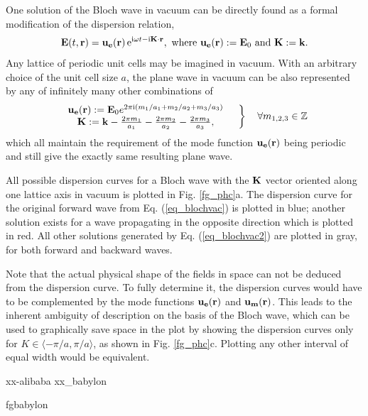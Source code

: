 One solution of the Bloch wave in vacuum can be directly found as a formal modification of the dispersion relation,
\begin{equation}  
\mathbf{E}(t, {\mathbf{r}}) = \mathbf{u_e}({\mathbf{r}})\,\mathrm{e}^{{\mathrm i}\omega t - {\mathrm i}{\mathbf{K}}\cdot{\mathbf{r}}}, \text{ where } \mathbf{u_e}({\mathbf{r}}) := \mathbf{E}_0  \text{ and } {\mathbf{K}} := {\mathbf{k}}.
\label{eq_blochvac}
\end{equation}
Any lattice of periodic unit cells may be imagined in vacuum. With an arbitrary choice of the unit cell size $a$, %
the plane wave in vacuum can be also represented by any of infinitely many other combinations of
\begin{equation} 
\left.  \begin{array}{cc}
\mathbf{u_{e}}({\mathbf{r}}) := \mathbf{E}_0 e^{2\pi{\mathrm i} (m_1/a_1 + m_2/a_2 + m_3/a_3)} \\
{\mathbf{K}} := {\mathbf{k}} - \frac{2\pi m_1}{a_1} - \frac{2\pi m_2}{a_2}- \frac{2\pi m_3}{a_3},
\end{array}\quad \right\} \quad \forall m_{1,2,3} \in \mathbb{Z}
\label{eq_blochvac2}
\end{equation}
which all maintain the requirement of the mode function $\mathbf{u_{e}}({\mathbf{r}})$ being periodic and still give the exactly same resulting plane wave.  

All possible dispersion curves for a Bloch wave with the ${\mathbf{K}}$ vector oriented along one lattice axis in vacuum is plotted in Fig. \ref{fg_phc}a. The dispersion curve for the original forward wave from Eq. (\ref{eq_blochvac}) is plotted in blue; another solution exists for a wave propagating in the opposite direction which is plotted in red. All other solutions generated by Eq. (\ref{eq_blochvac2}) are plotted in gray, for both forward and backward waves. 

Note that the actual physical shape of the fields in space can not be deduced from the dispersion curve. To fully determine it, the dispersion curves would have to be complemented by the mode functions $\mathbf{u_e}({\mathbf{r}})$ and $\mathbf{u_m}({\mathbf{r}})$. This leads to the inherent ambiguity of description on the basis of the Bloch wave, which can be used to graphically save space in the plot by showing the dispersion curves only for $K\in\langle-\pi/a, \pi/a\rangle$, as shown in Fig. \ref{fg_phc}c. Plotting any other interval of equal width would be equivalent. 

xx-alibaba
xx_babylon

fgbabylon

